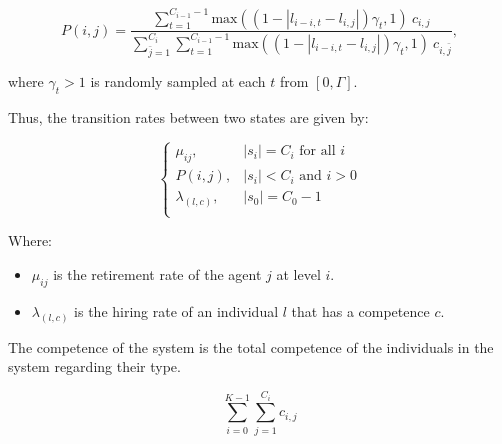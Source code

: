 \documentclass{article}
\begin{document}
\begin{equation}
    P(i, j) =
    \frac{
    \displaystyle \sum_{t = 1} ^ {C_{i -1} - 1} \text{max}((1 - |l_{i-i, t} - l_{i, j}|) \gamma_t, 1) \ c_{i, j}}
    {
    \displaystyle \sum_{\bar{j}=1}^{C_i} \sum_{t = 1} ^ {C_{i -1} - 1} \text{max}((1 - |l_{i-i, t} - l_{i, j}|) \gamma_t, 1) \ c_{i, \bar{j}}
    },
\end{equation}

where \(\gamma_{t} > 1\) is randomly sampled at each \(t\) from \([0, \Gamma]\).

Thus, the transition rates between two states are given by:

\begin{equation}\label{eqn:transition_rates}
        \begin{cases}
            \mu_{ij},& |s_i| = C_i\text{ for all }i\\
            P(i, j), & |s_i| < C_{i} \text{ and }i > 0\\
           \lambda_{(l, c)},& |s_{0}| = C_0 - 1\\
        \end{cases}
\end{equation}

Where:

\begin{itemize}
    \item \(\mu_{ij}\) is the retirement rate of the agent \(j\) at level
        \(i\).
    \item \(\lambda_{(l, c)}\) is the hiring rate of an individual \(l\) that has
    a competence \(c\).
\end{itemize}

The competence of the system is the total competence of the individuals in the
system regarding their type.

\begin{equation}\label{eqn:state_space}
    \sum_{i = 0} ^ {K - 1} \sum_{j=1} ^ {C_i} c_{i, j}
\end{equation}
\end{document}
